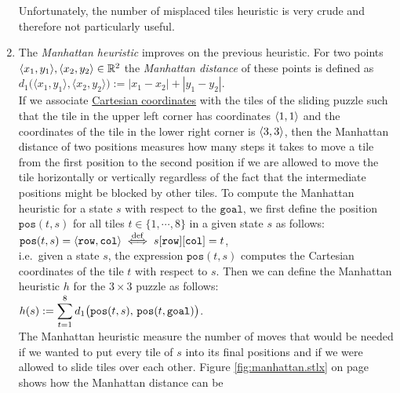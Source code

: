 \begin{enumerate}
      Unfortunately, the number of misplaced tiles heuristic is very crude and therefore not
      particularly useful.
\item The \emph{\color{blue}Manhattan heuristic} improves on the previous heuristic.  For two points 
      $\pair(x_1, y_1), \pair(x_2, y_2) \in \mathbb{R}^2$ the \emph{\color{blue}Manhattan distance} of these
      points is defined as 
      \\[0.2cm]
      \hspace*{1.3cm}
      $d_1\bigl(\langle x_1, y_1\rangle, \langle x_2, y_2\rangle\bigr) := |x_1 - x_2| + |y_1 - y_2|$.
      \\[0.2cm]
      If we associate \href{https://en.wikipedia.org/wiki/Cartesian_coordinate_system}{Cartesian coordinates} with
      the tiles of the sliding puzzle such that the tile in the upper left corner has coordinates
      $\pair(1, 1)$ and the coordinates of the tile in the lower right corner is $\pair(3, 3)$, then
      the Manhattan distance of two positions measures how many steps it takes to move a tile from
      the first position to the second position if we are allowed to move the tile horizontally
      or vertically regardless of the fact that the intermediate positions might be blocked by
      other tiles.  To compute the Manhattan heuristic for a state $s$ with respect to the
      $\mathtt{goal}$, we first define the position $\mathtt{pos}(t, s)$ for all tiles 
      $t \in \{1,\cdots, 8\}$ in a given state $s$ as follows:
      \\[0.2cm]
      \hspace*{1.3cm}
      $\mathtt{pos}(t, s) = \pair(\mathtt{row}, \mathtt{col}) 
         \;\stackrel{\mathrm{def}}{\Longleftrightarrow}\; s[\mathtt{row}][\mathtt{col}] = t
      $,
      \\[0.2cm]
      i.e.~given a state $s$, the expression $\mathtt{pos}(t, s)$ computes the Cartesian coordinates of
      the tile $t$ with respect to $s$.  Then we can define the Manhattan heuristic $h$ for the $3 \times 3$ puzzle
      as follows:  
      \\[0.2cm]
      \hspace*{1.3cm}
      $\displaystyle h(s) := \sum\limits_{t=1}^8 d_1\bigl(\mathtt{pos}(t,s),\, \mathtt{pos}(t, \mathtt{goal})\bigr)$.
      \\[0.2cm]
      The Manhattan heuristic measure the number of moves that would be needed if we wanted to put every tile
      of $s$ into its final positions and if we were allowed to slide tiles over each other.  Figure
      \ref{fig:manhattan.stlx} on page \pageref{fig:manhattan.stlx} shows how the Manhattan distance can be

\end{enumerate}
